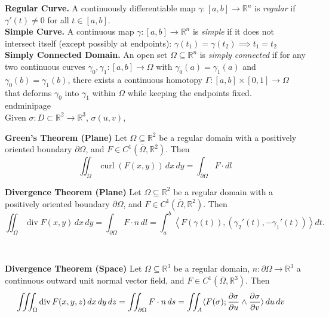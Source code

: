\documentclass[8pt]{article}
\begin{document}
\vspace*{-20px}
\noindent\textbf{Regular Curve.} A continuously differentiable map
$\gamma : [a,b] \to \mathbb{R}^n$
is \emph{regular} if $\gamma'(t) \neq 0$ for all $t \in [a,b]$. \\
\noindent\textbf{Simple Curve.}
A continuous map
$\gamma : [a,b] \to \mathbb{R}^n$
is \emph{simple} if it does not intersect itself (except possibly at endpoints):
$\gamma(t_1) = \gamma(t_2) \implies t_1 = t_2$ \\
\noindent\textbf{Simply Connected Domain.}
An open set $\Omega \subseteq \mathbb{R}^n$ is \emph{simply connected} if for any two continuous curves
$\gamma_0, \gamma_1 : [a,b] \to \Omega$
with $\gamma_0(a) = \gamma_1(a)$ and $\gamma_0(b) = \gamma_1(b)$,
there exists a continuous homotopy
$\Gamma : [a,b]\times[0,1] \to \Omega$
that deforms $\gamma_0$ into $\gamma_1$ within $\Omega$ while keeping the endpoints fixed.\\[-2pt]
end{minipage}
\\
Given $\sigma : D \subset \mathbb{R}^2 \to \mathbb{R}^3$, $\sigma(u,v)$,\\
\begin{minipage}[htp]{0.49\textwidth}
\noindent\textbf{Green's Theorem (Plane)}
Let \( \Omega \subseteq \mathbb{R}^2 \) be a regular domain with a positively oriented boundary \( \partial \Omega \), and \( F \in C^1(\overline{\Omega}, \mathbb{R}^2) \). Then
\vspace{-10px}\[
\iint_{\Omega} \operatorname{curl}(F(x, y)) \, dx \, dy = \int_{\partial \Omega} F \cdot dl
\]
\end{minipage}
\hfill
\begin{minipage}[htp]{0.49\textwidth}
\noindent\textbf{Divergence Theorem (Plane)}
Let \( \Omega \subseteq \mathbb{R}^2 \) be a regular domain with a positively oriented boundary \( \partial \Omega \), and \( F \in C^1(\overline{\Omega}, \mathbb{R}^2) \). Then
\vspace{-10px}\[
\iint_{\Omega} \operatorname{div} F(x, y) \, dx \, dy = \int_{\partial \Omega} F \cdot n \, dl = \int_a^b \left\langle F(\gamma(t)), (\gamma_2'(t), -\gamma_1'(t)) \right\rangle dt.
\]
\end{minipage}
\\
\begin{minipage}[htp]{0.49\textwidth}
\noindent\textbf{Divergence Theorem (Space)}
Let \( \Omega \subseteq \mathbb{R}^3 \) be a regular domain, \( n : \partial \Omega \to \mathbb{R}^3 \) a continuous outward unit normal vector field, and \( F \in C^1(\overline{\Omega}, \mathbb{R}^3) \). Then
\[\hspace{-10px}
\iiint_{\Omega} \operatorname{div} F(x,y,z) \, dx \, dy \, dz = \iint_{\partial \Omega} F \cdot n \, ds = \iint_{A} \langle F(\sigma); \frac{\partial \sigma}{\partial u} \wedge \frac{\partial \sigma}{\partial v} \rangle \, du \, dv
\]

\end{minipage}
\end{document}
